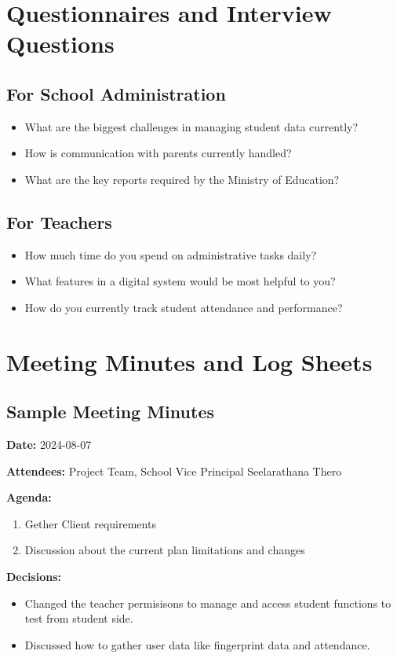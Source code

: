 \documentclass[12pt,a4paper]{report}
\begin{document}
\section{Questionnaires and Interview Questions}
\subsection{For School Administration}
\begin{itemize}
    \item What are the biggest challenges in managing student data currently?
    \item How is communication with parents currently handled?
    \item What are the key reports required by the Ministry of Education?
\end{itemize}

\subsection{For Teachers}
\begin{itemize}
    \item How much time do you spend on administrative tasks daily?
    \item What features in a digital system would be most helpful to you?
    \item How do you currently track student attendance and performance?
\end{itemize}

\section{Meeting Minutes and Log Sheets}
\subsection{Sample Meeting Minutes}
\textbf{Date:} 2024-08-07

\textbf{Attendees:} Project Team, School Vice Principal Seelarathana Thero

\textbf{Agenda:}
\begin{enumerate}
    \item Gether Client requirements
    \item Discussion about the current plan limitations and changes
\end{enumerate}

\textbf{Decisions:}
\begin{itemize}
    \item Changed the teacher permisisons to manage and access student functions to test from student side.
    \item Discussed how to gather user data like fingerprint data and attendance.
\end{itemize}
\end{document}

